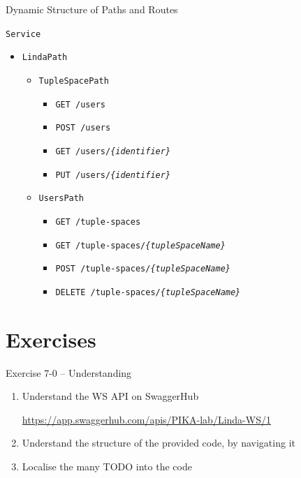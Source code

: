 \documentclass[presentation]{beamer}\mode<presentation>{\usetheme{AMSCesenaPurpleAndGold}}
\begin{document}
\begin{frame}{Dynamic Structure of Paths and Routes}
    
    \texttt{Service}
    \begin{itemize}
        \item \texttt{LindaPath}
        \begin{itemize}
            \item \texttt{TupleSpacePath}
            \begin{itemize}
                \item \texttt{GET /users}
                \item \texttt{POST /users}
                \item \texttt{GET /users/\textit{\{identifier\}}}
                \item \texttt{PUT /users/\textit{\{identifier\}}}
            \end{itemize}
            \item \texttt{UsersPath}
            \begin{itemize}
                \item \texttt{GET /tuple-spaces}
                \item \texttt{GET /tuple-spaces/\textit{\{tupleSpaceName\}}}
                \item \texttt{POST /tuple-spaces/\textit{\{tupleSpaceName\}}}
                \item \texttt{DELETE /tuple-spaces/\textit{\{tupleSpaceName\}}}
            \end{itemize}
        \end{itemize}
    \end{itemize}
    
\end{frame}

\section{Exercises}

\begin{frame}{Exercise 7-0 -- Understanding}
    \begin{enumerate}
        \item Understand the \linda{} WS API on SwaggerHub
        \begin{center}
            \url{https://app.swaggerhub.com/apis/PIKA-lab/Linda-WS/1}
        \end{center}
        
        \vfill
        
        \item Understand the structure of the provided code, by navigating it
        
        \vfill
        
        \item Localise the many TODO into the code
        
    \end{enumerate}
\end{frame}
\end{document}
